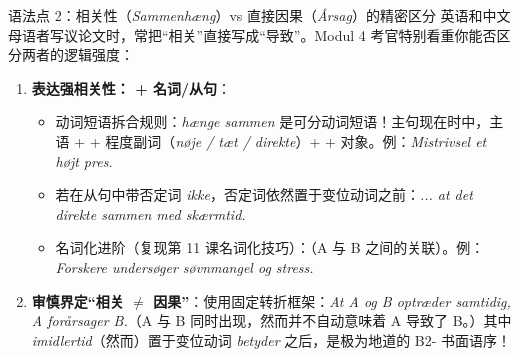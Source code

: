 \begin{grammatikbox}{语法点 2：相关性（\textit{Sammenhæng}）vs 直接因果（\textit{Årsag}）的精密区分}
英语和中文母语者写议论文时，常把“相关”直接写成“导致”。Modul 4 考官特别看重你能否区分两者的逻辑强度：
\begin{enumerate}
  \item \textbf{表达强相关性： + 名词/从句}：
    \begin{itemize}
      \item 动词短语拆合规则：\textit{hænge sammen} 是可分动词短语！主句现在时中，主语 +  + 程度副词（\textit{nøje / tæt / direkte}）+  + 对象。例：\textit{Mistrivsel  et højt pres.}
      \item 若在从句中带否定词 \textit{ikke}，否定词依然置于变位动词之前：\textit{... at det  direkte sammen med skærmtid.}
      \item 名词化进阶（复现第 11 课名词化技巧）：（A 与 B 之间的关联）。例：\textit{Forskere undersøger  søvnmangel og stress.}
    \end{itemize}
  \item \textbf{审慎界定“相关 $\neq$ 因果”}：使用固定转折框架：\textit{At A og B optræder samtidig,  A forårsager B.}（A 与 B 同时出现，然而并不自动意味着 A 导致了 B。）其中 \textit{imidlertid}（然而）置于变位动词 \textit{betyder} 之后，是极为地道的 B2- 书面语序！
\end{enumerate}
\end{grammatikbox}

